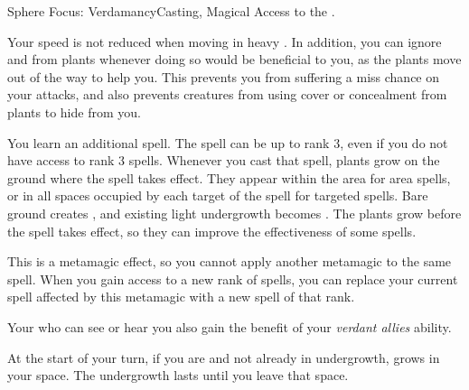   \begin{magicalfeat}{Sphere Focus: Verdamancy}{Casting, Magical}
    \featpre Access to the  .

     Your speed is not reduced when moving in heavy .
    In addition, you can ignore  and  from plants whenever doing so would be beneficial to you, as the plants move out of the way to help you.
    This prevents you from suffering a miss chance on your attacks, and also prevents creatures from using cover or concealment from plants to hide from you.

     You learn an additional spell.
    The spell can be up to rank 3, even if you do not have access to rank 3 spells.
    Whenever you cast that spell, plants \briefly grow on the ground where the spell takes effect.
    They appear within the area for area spells, or in all spaces occupied by each target of the spell for targeted spells.
    Bare ground creates , and existing light undergrowth becomes .
    The plants grow before the spell takes effect, so they can improve the effectiveness of some  spells.

    This is a metamagic effect, so you cannot apply another metamagic to the same spell.
    When you gain access to a new rank of spells, you can replace your current spell affected by this metamagic with a new spell of that rank.

     Your  who can see or hear you also gain the benefit of your \textit{verdant allies} ability.

     At the start of your turn, if you are  and not already in undergrowth,  grows in your space.
    The undergrowth lasts until you leave that space.
  \end{magicalfeat}

